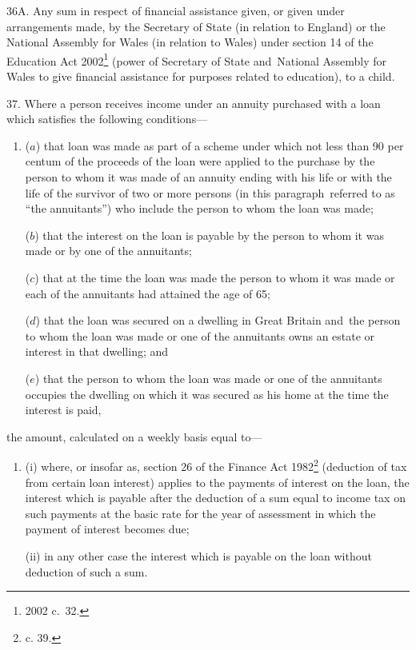 \documentclass[12pt,a4paper]{article}
\begin{document}
\medskip

36A.  Any sum in respect of financial assistance given, or given under arrangements made, by the Secretary of State (in relation to England) or the National Assembly for Wales (in relation to Wales) under section 14 of the Education Act 2002\footnote{2002 c.\ 32.} (power of Secretary of State and~National Assembly for Wales to give financial assistance for purposes related to education), to a child.


\medskip

37.  Where a person receives income under an annuity purchased with a loan which satisfies the following conditions—
\begin{enumerate}\item[]
($a$) that loan was made as part of a scheme under which not less than 90 per centum of the proceeds of the loan were applied to the purchase by the person to whom it was made of an annuity ending with his life or with the life of the survivor of two or more persons (in this paragraph~referred to as “the annuitants”) who include the person to whom the loan was made;

($b$) that the interest on the loan is payable by the person to whom it was made or by one of the annuitants;

($c$) that at the time the loan was made the person to whom it was made or each of the annuitants had attained the age of 65;

($d$) that the loan was secured on a dwelling in Great Britain and~the person to whom the loan was made or one of the annuitants owns an estate or interest in that dwelling; and

($e$) that the person to whom the loan was made or one of the annuitants occupies the dwelling on which it was secured as his home at the time the interest is paid,
\end{enumerate}
the amount, calculated on a weekly basis equal to—
\begin{enumerate}\item[]
(i) where, or insofar as, section 26 of the Finance Act 1982\footnote{ c. 39.} (deduction of tax from certain loan interest) applies to the payments of interest on the loan, the interest which is payable after the deduction of a sum equal to income tax on such payments at the basic rate for the year of assessment in which the payment of interest becomes due;

(ii) in any other case the interest which is payable on the loan without deduction of such a sum.
\end{enumerate}
\end{document}
